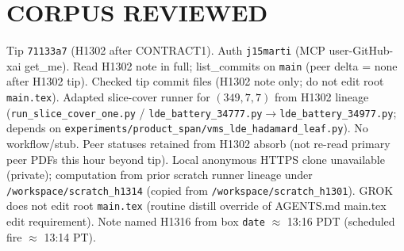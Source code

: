\documentclass[11pt]{article}
\begin{document}
\section*{CORPUS REVIEWED}
Tip \texttt{71133a7} (H1302 after CONTRACT1). Auth \texttt{j15marti} (MCP user-GitHub-xai get\_me).
Read H1302 note in full; list\_commits on \texttt{main} (peer delta = none after H1302 tip).
Checked tip commit files (H1302 note only; do not edit root \texttt{main.tex}).
Adapted slice-cover runner for $(349,7,7)$ from H1302 lineage
(\texttt{run\_slice\_cover\_one.py} / \texttt{lde\_battery\_34777.py}$\to$\texttt{lde\_battery\_34977.py};
depends on \texttt{experiments/product\_span/vms\_lde\_hadamard\_leaf.py}).
No workflow/stub. Peer statuses retained from H1302 absorb (not re-read primary peer PDFs this hour beyond tip).
Local anonymous HTTPS clone unavailable (private);
computation from prior scratch runner lineage under \texttt{/workspace/scratch\_h1314}
(copied from \texttt{/workspace/scratch\_h1301}).
GROK does not edit root \texttt{main.tex} (routine distill override of AGENTS.md main.tex edit requirement).
Note named H1316 from box \texttt{date} $\approx$ 13:16 PDT (scheduled fire $\approx$ 13:14 PT).
\end{document}
